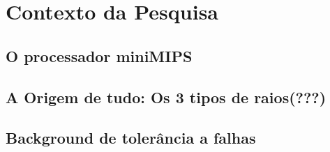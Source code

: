 \chapter{Contexto da Pesquisa}
\section{O processador miniMIPS}
\section{A Origem de tudo: Os 3 tipos de raios(???)}
\section{Background de tolerância a falhas}